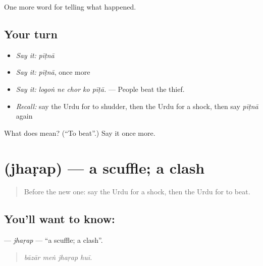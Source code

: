 \begin{grammarlens}[title={What you've built}]
One more word for telling what happened.
\end{grammarlens}

\subsection*{Your turn}
\begin{itemize}
\raggedright
  \item \emph{Say it:} \emph{pīṭnā}
  \item \emph{Say it:} \emph{pīṭnā}, once more
  \item \emph{Say it:} \emph{logoṅ ne chor ko pīṭā.} — People beat the thief.
  \item \emph{Recall:} say the Urdu for to shudder, then the Urdu for a shock, then say \emph{pīṭnā} again
\end{itemize}

\begin{tcolorbox}[breakable,colback=teal!4,colframe=teal!35!black,title={Before you move on}]
What does  mean? (\textquotedblleft{}To beat\textquotedblright{}.) Say it once more.
\end{tcolorbox}
\section[\texorpdfstring{\ur{جھڑپ} (jhaṛap)}{جھڑپ (jhaṛap)}]{ (jhaṛap) — a scuffle; a clash}

\label{lesson:UR-C307-jharap}



\begin{quote}
Before the new one: say the Urdu for a shock, then the Urdu for to beat.
\end{quote}

\subsection*{You'll want to know: }
\textbf{} — \emph{jhaṛap} — \textquotedblleft{}a scuffle; a clash\textquotedblright{}.

\begin{quote}
   
\end{quote}

\begin{quote}
\emph{bāzār meṅ jhaṛap huī.}
\end{quote}

